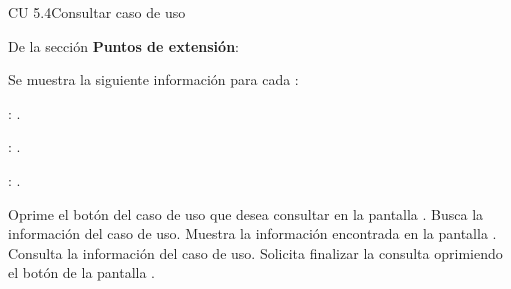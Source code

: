 \begin{UseCase}{CU 5.4}{Consultar caso de uso}
{			\UCli De la sección {\bf Puntos de extensión}:
			\begin{Citemize}
		        \item Se muestra la siguiente información para cada :
				\begin{Citemize}
	 				\item {}: \ioObtener.
	 				\item {}: \ioObtener.
	 				\item {}: \ioObtener.
				\end{Citemize}
			\end{Citemize}
		
	}
	

	


\end{UseCase}
 \begin{UCtrayectoria}
	\UCpaso[\UCactor] Oprime el botón \btnConsulta del caso de uso que desea consultar en la pantalla .
    \UCpaso[\UCsist] Busca la información del caso de uso.  %
    \UCpaso[\UCsist] Muestra la información encontrada en la pantalla .
    \UCpaso[\UCactor] Consulta la información del caso de uso. \label{cu5.4:consultarElemento}
    \UCpaso[\UCactor] Solicita finalizar la consulta oprimiendo el botón  de la pantalla .
 \end{UCtrayectoria}
 

